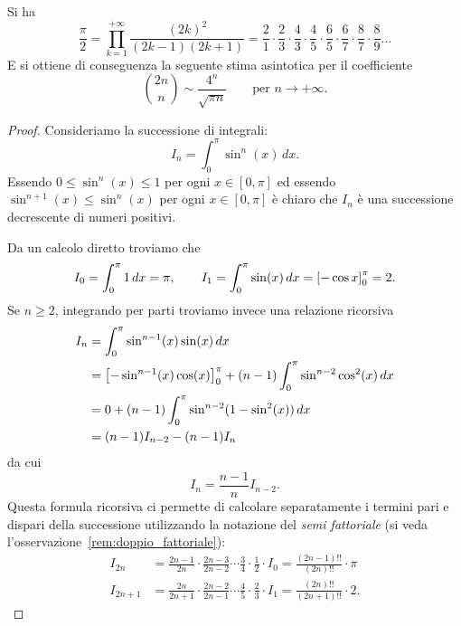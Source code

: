 \begin{theorem}
\label{th:wallis}%
\mymark{*}%
%
%
%
%
Si ha
\[
  \frac{\pi}{2}
  = \prod_{k=1}^{+\infty} \frac{(2k)^2}{(2k-1)(2k+1)}
  = \frac{2}{1}
  \cdot \frac{2}{3}
  \cdot \frac{4}{3}
  \cdot \frac{4}{5}
  \cdot \frac{6}{5}
  \cdot \frac{6}{7}
  \cdot \frac{8}{7}
  \cdot \frac{8}{9}
  \dots
\]
E si ottiene di conseguenza la seguente stima asintotica per
il coefficiente 
\[
 {2n \choose n} \sim \frac{4^n}{\sqrt{\pi n}}
 \qquad \text{per $n\to +\infty$.}
\]
\end{theorem}
%
\begin{proof}
Consideriamo la successione di integrali:
\[
  I_n = \int_0^\pi \sin^n(x)\, dx.
\]
Essendo $0\le \sin^n(x) \le 1$ per ogni $x\in [0,\pi]$ ed essendo
$\sin^{n+1}(x)\le \sin^n(x)$ per ogni $x\in[0,\pi]$ è chiaro che $I_n$ è una
successione decrescente di numeri positivi.

Da un calcolo diretto troviamo che
\[
  I_0 = \int_0^\pi 1\, dx = \pi, \qquad
  I_1 = \int_0^\pi \sin(x)\, dx = {\left[ -\cos x \right]}_0^\pi = 2.
\]
Se $n\ge 2$,
integrando per parti troviamo invece una relazione ricorsiva
\begin{align*}
 I_n &= \int_0^\pi \sin^{n-1}(x) \sin(x)\, dx \\
     &= {\left[ -\sin^{n-1}(x)\cos(x) \right]}_0^\pi + (n-1)\int_0^\pi \sin^{n-2} \cos^2(x)\, dx \\
     &= 0 + (n-1)\int_0^\pi\sin^{n-2}(1-\sin^2(x))\, dx \\
     &= (n-1) I_{n-2} - (n-1) I_{n}
\end{align*}
da cui
\begin{equation}
\label{eq:187464}%
  I_n = \frac{n-1}{n} I_{n-2}.
\end{equation}
Questa formula ricorsiva ci permette di calcolare separatamente
i termini pari e dispari della successione
utilizzando la notazione del \emph{semi fattoriale}
(si veda l'osservazione~\ref{rem:doppio_fattoriale}):
\begin{align*}
  I_{2n}
  &= \frac{2n-1}{2n}\cdot \frac{2n-3}{2n-2} \cdots \frac {3}{4}\cdot \frac{1}{2} \cdot I_0
  = \frac{(2n-1)!!}{(2n)!!} \cdot \pi \\
  I_{2n+1} &= \frac{2n}{2n+1}\cdot \frac {2n-2}{2n-1} \cdots
  \frac{4}{5}\cdot \frac{2}{3} \cdot I_1
  = \frac{(2n)!!}{(2n+1)!!}\cdot 2.
\end{align*}


\end{proof}
